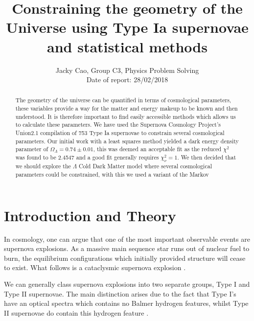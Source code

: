 \documentclass[twocolumn]{revtex4}
\begin{document}
\textheight=26.385cm

\title{Constraining the geometry of the Universe using Type Ia supernovae and statistical methods}
 
\author{Jacky Cao, Group C3, Physics Problem Solving \\ Date of report: 28/02/2018}

\begin{abstract}     
The geometry of the universe can be quantified in terms of cosmological parameters, these variables provide a way for the matter and energy makeup to be known and then understood. It is therefore important to find easily accessible methods which allows us to calculate these parameters. We have used the Supernova Cosmology Project's Union2.1 compilation of 753 Type Ia supernovae to constrain several cosmological parameters. Our initial work with a least squares method yielded a dark energy density parameter of $\Omega_\Lambda=0.74\pm0.01$, this was deemed an acceptable fit as the reduced $\chi^2$ was found to be 2.4547 and a good fit generally requires $\chi^2_\nu=1$. We then decided that we should explore the $\Lambda$ Cold Dark Matter model where several cosmological parameters could be constrained, with this we used a variant of the Markov 


\end{abstract}

\maketitle

\vspace{-3ex}
\section{Introduction and Theory} 
\vspace{-2ex}
In cosmology, one can argue that one of the most important observable events are supernova explosions. As a massive main sequence star runs out of nuclear fuel to burn, the equilibrium configurations which initially provided structure will cease to exist. What follows is a cataclysmic supernova explosion \cite{longair}. 

We can generally class supernova explosions into two separate groups, Type I and Type II supernovae. The main distinction arises due to the fact that Type I's have an optical spectra which contains no Balmer hydrogen features, whilst Type II supernovae do contain this hydrogen feature \cite{mod_ast}. 
\end{document}

